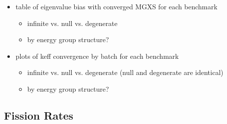 \begin{itemize}[noitemsep]
  \item table of eigenvalue bias with converged MGXS for each benchmark
  \begin{itemize}[noitemsep]
    \item infinite vs. null vs. degenerate
    \item by energy group structure?
  \end{itemize}
  \item plots of keff convergence by batch for each benchmark
  \begin{itemize}[noitemsep]
    \item infinite vs. null vs. degenerate (null and degenerate are identical)
    \item by energy group structure?
  \end{itemize}
\end{itemize}

\subsection{Fission Rates}
\label{subsec:chap8-fiss-rates}


